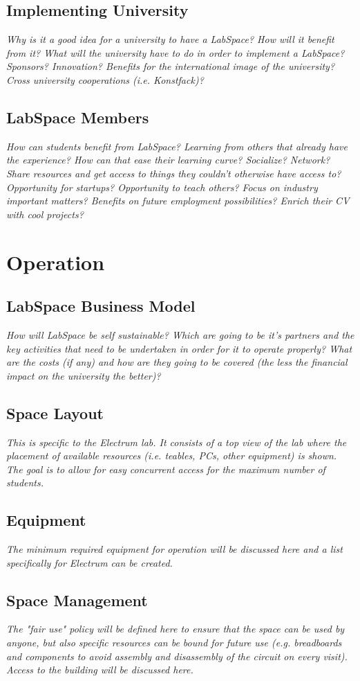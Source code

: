 \documentclass[a4paper, 11pt]{article}
\begin{document}
\subsection{Implementing University}
\textit{Why is it a good idea for a university to have a LabSpace? How will it benefit from it? What will the university have to do in order to implement a LabSpace? Sponsors? Innovation? Benefits for the international image of the university? Cross university cooperations (i.e. Konstfack)?}

\subsection{LabSpace Members}
\textit{How can students benefit from LabSpace? Learning from others that already have the experience? How can that ease their learning curve? Socialize? Network? Share resources and get access to things they couldn't otherwise have access to? Opportunity for startups? Opportunity to teach others? Focus on industry important matters? Benefits on future employment possibilities? Enrich their CV with cool projects?}


\section{Operation}

\subsection{LabSpace Business Model}
\textit{How will LabSpace be self sustainable? Which are going to be it's partners and the key activities that need to be undertaken in order for it to operate properly? What are the costs (if any) and how are they going to be covered (the less the financial impact on the university the better)?}

\subsection{Space Layout}
\textit{This is specific to the Electrum lab. It consists of a top view of the lab where the placement of available resources (i.e. teables, PCs, other equipment) is shown. The goal is  to allow for  easy concurrent access for the maximum number of students.}

\subsection{Equipment}
\textit{The minimum required equipment for operation will be discussed here and a list specifically for Electrum can be created.}

\subsection{Space Management}
\textit{The "fair use" policy will be defined here to ensure that the space can be used by anyone, but also specific resources can be bound for future use (e.g. breadboards and components to avoid assembly and disassembly of the circuit on every visit). Access to the building will be discussed here.}
\end{document}
